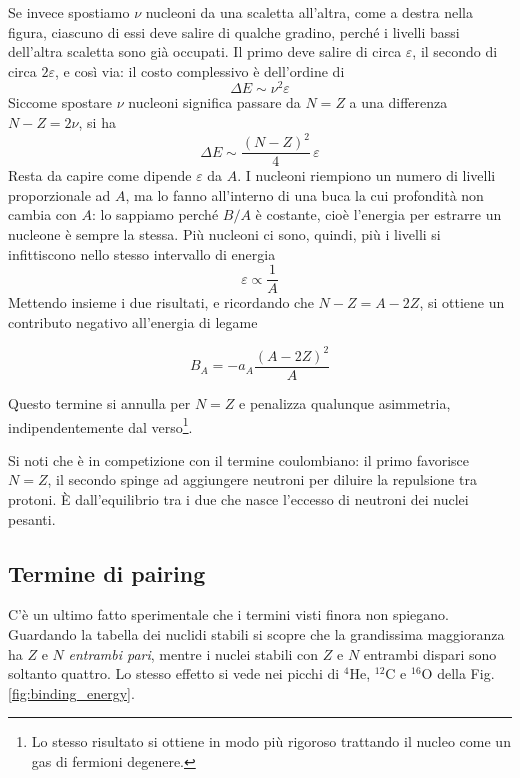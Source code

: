Se invece spostiamo $\nu$ nucleoni da una scaletta all'altra, come a destra nella figura, ciascuno di essi deve salire di qualche gradino, perché i livelli bassi dell'altra scaletta sono già occupati. Il primo deve salire di circa $\varepsilon$, il secondo di circa $2\varepsilon$, e così via: il costo complessivo è dell'ordine di
%
\begin{equation}
    \Delta E \sim \nu^2 \varepsilon
\end{equation}
Siccome spostare $\nu$ nucleoni significa passare da $N = Z$ a una differenza $N - Z = 2\nu$, si ha
%
\begin{equation}
    \Delta E \sim \frac{(N-Z)^2}{4} \, \varepsilon
\end{equation}
Resta da capire come dipende $\varepsilon$ da $A$. I nucleoni riempiono un numero di livelli proporzionale ad $A$, ma lo fanno all'interno di una buca la cui profondità non cambia con $A$: lo sappiamo perché $B/A$ è costante, cioè l'energia per estrarre un nucleone è sempre la stessa. Più nucleoni ci sono, quindi, più i livelli si infittiscono nello stesso intervallo di energia
%
\begin{equation}
    \varepsilon \propto \frac{1}{A}
\end{equation}
Mettendo insieme i due risultati, e ricordando che $N - Z = A - 2Z$, si ottiene un contributo negativo all'energia di legame
%
\begin{tcolorbox}[colback=black!5!white, colframe=black!45!white, boxrule=0.8pt]
\begin{equation}
    B_A = - a_A \frac{(A - 2Z)^2}{A}
\end{equation}
\end{tcolorbox}
Questo termine si annulla per $N = Z$ e penalizza qualunque asimmetria, indipendentemente dal verso\footnote{Lo stesso risultato si ottiene in modo più rigoroso trattando il nucleo come un gas di fermioni degenere.}. 

Si noti che è in competizione con il termine coulombiano: il primo favorisce $N = Z$, il secondo spinge ad aggiungere neutroni per diluire la repulsione tra protoni. È dall'equilibrio tra i due che nasce l'eccesso di neutroni dei nuclei pesanti. 

\subsection{Termine di pairing}

C'è un ultimo fatto sperimentale che i termini visti finora non spiegano. Guardando la tabella dei nuclidi stabili si scopre che la grandissima maggioranza ha $Z$ e $N$ \emph{entrambi pari}, mentre i nuclei stabili con $Z$ e $N$ entrambi dispari sono soltanto quattro. Lo stesso effetto si vede nei picchi di ${}^{4}\mathrm{He}$, ${}^{12}\mathrm{C}$ e ${}^{16}\mathrm{O}$ della Fig. \ref{fig:binding_energy}. 

